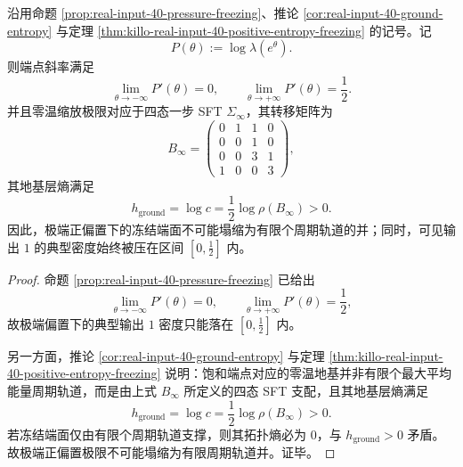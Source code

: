 \begin{theorem}[输出位势零温极限的正熵四态地基层与饱和密度上界]\label{thm:xi-real-input-40-output-freezing-positive-entropy-halffill}
沿用命题 \ref{prop:real-input-40-pressure-freezing}、推论 \ref{cor:real-input-40-ground-entropy} 与定理 \ref{thm:killo-real-input-40-positive-entropy-freezing} 的记号。记
\[
P(\theta):=\log\lambda(e^\theta).
\]
则端点斜率满足
\[
\lim_{\theta\to-\infty}P'(\theta)=0,
\qquad
\lim_{\theta\to+\infty}P'(\theta)=\frac12.
\]
并且零温缩放极限对应于四态一步 SFT \(\Sigma_\infty\)，其转移矩阵为
\[
B_\infty=
\begin{pmatrix}
0&1&1&0\\
0&0&1&0\\
0&0&3&1\\
1&0&0&3
\end{pmatrix},
\]
其地基层熵满足
\[
h_{\mathrm{ground}}
=
\log c
=
\frac12\log\rho(B_\infty)
>
0.
\]
因此，极端正偏置下的冻结端面不可能塌缩为有限个周期轨道的并；同时，可见输出 \(1\) 的典型密度始终被压在区间 \([0,\tfrac12]\) 内。
\end{theorem}
\begin{proof}
命题 \ref{prop:real-input-40-pressure-freezing} 已给出
\[
\lim_{\theta\to-\infty}P'(\theta)=0,
\qquad
\lim_{\theta\to+\infty}P'(\theta)=\frac12,
\]
故极端偏置下的典型输出 \(1\) 密度只能落在 \([0,\tfrac12]\) 内。

另一方面，推论 \ref{cor:real-input-40-ground-entropy} 与定理 \ref{thm:killo-real-input-40-positive-entropy-freezing} 说明：饱和端点对应的零温地基并非有限个最大平均能量周期轨道，而是由上式 \(B_\infty\) 所定义的四态 SFT 支配，且其地基层熵满足
\[
h_{\mathrm{ground}}=\log c=\frac12\log\rho(B_\infty)>0.
\]
若冻结端面仅由有限个周期轨道支撑，则其拓扑熵必为 \(0\)，与 \(h_{\mathrm{ground}}>0\) 矛盾。故极端正偏置极限不可能塌缩为有限周期轨道并。证毕。
\end{proof}


